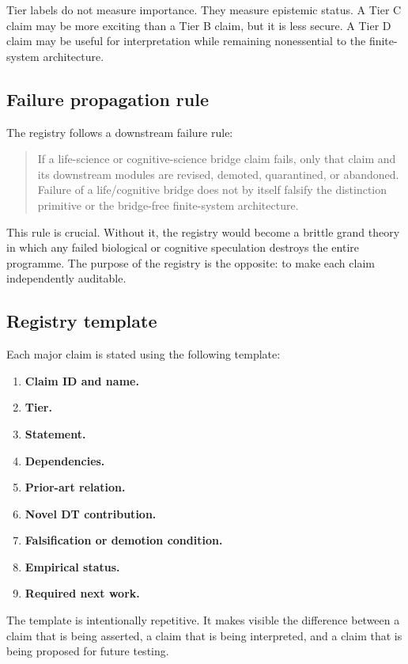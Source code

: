 \documentclass[10pt,a4paper,twocolumn,aps,prl]{revtex4-2}
\theoremstyle{claimstyle}
\theoremstyle{definition}
\begin{document}
Tier labels do not measure importance. They measure epistemic status. A Tier C claim may be more exciting than a Tier B claim, but it is less secure. A Tier D claim may be useful for interpretation while remaining nonessential to the finite-system architecture.

\subsection{Failure propagation rule}

The registry follows a downstream failure rule:
\begin{quote}
If a life-science or cognitive-science bridge claim fails, only that claim and its downstream modules are revised, demoted, quarantined, or abandoned. Failure of a life/cognitive bridge does not by itself falsify the distinction primitive or the bridge-free finite-system architecture.
\end{quote}

This rule is crucial. Without it, the registry would become a brittle grand theory in which any failed biological or cognitive speculation destroys the entire programme. The purpose of the registry is the opposite: to make each claim independently auditable.

\subsection{Registry template}

Each major claim is stated using the following template:
\begin{enumerate}
    \item \textbf{Claim ID and name.}
    \item \textbf{Tier.}
    \item \textbf{Statement.}
    \item \textbf{Dependencies.}
    \item \textbf{Prior-art relation.}
    \item \textbf{Novel DT contribution.}
    \item \textbf{Falsification or demotion condition.}
    \item \textbf{Empirical status.}
    \item \textbf{Required next work.}
\end{enumerate}
The template is intentionally repetitive. It makes visible the difference between a claim that is being asserted, a claim that is being interpreted, and a claim that is being proposed for future testing.
\end{document}
